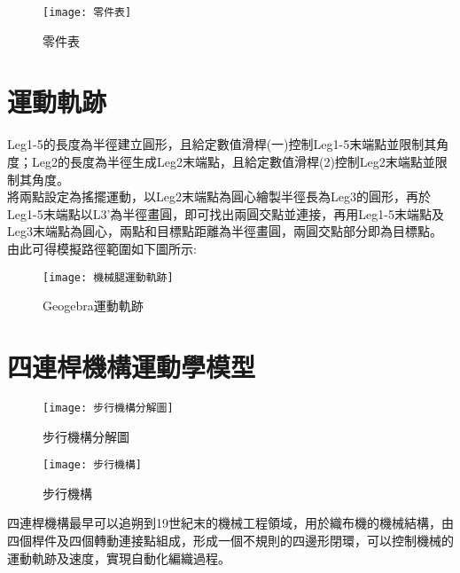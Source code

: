 \begin{figure}[hbt!]
\begin{center}
\texttt{[image: 零件表]}
\caption{\Large 零件表}\label{零件表}
\end{center}
\end{figure}
\newpage


\section{運動軌跡}
Leg1-5的長度為半徑建立圓形，且給定數值滑桿(一)控制Leg1-5末端點並限制其角度；Leg2的長度為半徑生成Leg2末端點，且給定數值滑桿(2)控制Leg2末端點並限制其角度。\\

將兩點設定為搖擺運動，以Leg2末端點為圓心繪製半徑長為Leg3的圓形，再於Leg1-5末端點以L3’為半徑畫圓，即可找出兩圓交點並連接，再用Leg1-5末端點及Leg3末端點為圓心，兩點和目標點距離為半徑畫圓，兩圓交點部分即為目標點。\\

由此可得模擬路徑範圍如下圖所示:\\
\begin{figure}[hbt!]
\begin{center}
\texttt{[image: 機械腿運動軌跡]}
\caption{\Large Geogebra運動軌跡}\label{機械腿運動軌跡}
\end{center}
\end{figure}

\newpage

\section{四連桿機構運動學模型}

\begin{figure}[htbp]
  \begin{minipage}[t]{0.5\linewidth}
    \centering
    \texttt{[image: 步行機構分解圖]}
    \caption{步行機構分解圖}
    \label{步行機構分解圖}
  \end{minipage}
  \hfill
  \begin{minipage}[t]{0.4\linewidth}
    \centering
    \texttt{[image: 步行機構]}
    \caption{步行機構}
    \label{步行機構}
  \end{minipage}
\end{figure}

四連桿機構最早可以追朔到19世紀末的機械工程領域，用於織布機的機械結構，由四個桿件及四個轉動連接點組成，形成一個不規則的四邊形閉環，可以控制機械的運動軌跡及速度，實現自動化編織過程。\\

